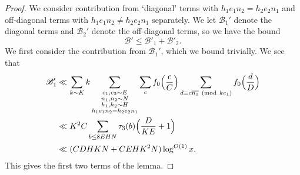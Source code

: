 \documentclass[10pt]{amsart}
\theoremstyle{plain}
\numberwithin{equation}{section}
\newcommand{\Mod}[1]{\ (\mathrm{mod}\ #1)}
\begin{document}
\begin{proof}
We consider contribution from `diagonal' terms with $h_1e_1n_2=h_2e_2n_1$ and off-diagonal terms with $h_1e_1n_2\ne h_2e_2n_1$ separately. We let $\mathscr{B}_1'$ denote the diagonal terms and $\mathscr{B}_2'$ denote the off-diagonal terms, so we have the bound
\[
\mathscr{B}'\le \mathscr{B}'_1+\mathscr{B}'_2.
\]
We first consider the contribution from $\mathscr{B}_1'$, which we bound trivially. We see that
\begin{align*}
\mathscr{B}'_1&\ll \sum_{k\sim K}k\sum_{\substack{e_1,e_2\sim E\\ n_1,n_2\sim N\\ h_1, h_2\sim H\\ h_1e_1n_2=h_2e_2n_1}}\sum_{c}f_0\Bigl(\frac{c}{C}\Bigr)\sum_{\substack{d\equiv c\overline{n_1}\Mod{k e_1}}}f_0\Bigl(\frac{d}{D}\Bigr)\\
&\ll K^2C\sum_{b\le 8E H N}\tau_3(b)\Bigl(\frac{D}{K E}+1\Bigr)\\
&\ll (C D H K N+C E H K^2 N)\log^{O(1)}{x}.
\end{align*}
This gives the first two terms of the lemma.


\end{proof}
\end{document}
